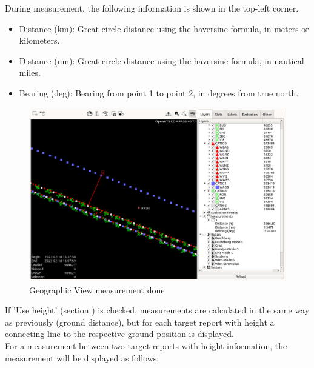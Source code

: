 During measurement, the following information is shown in the top-left corner.

\begin{itemize}
 \item Distance (km): Great-circle distance using the haversine formula, in meters or kilometers.
 \item Distance (nm): Great-circle distance using the haversine formula, in nautical miles.
 \item  Bearing (deg): Bearing from point 1 to point 2, in degrees from true north.
\end{itemize}

\begin{figure}[H]
    \hspace*{-2.5cm}
    \includegraphics[width=19cm,frame]{figures/geoview_measure2.png}
  \caption{Geographic View measurement done}
\end{figure}

If 'Use height' (section ) is checked, measurements are calculated in the same way as previously (ground distance), but for each target report with height a connecting line to the respective ground position is displayed. \\

For a measurement between two target reports with height information, the measurement will be displayed as follows:

